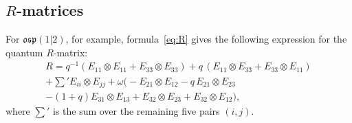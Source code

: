 \documentclass[12pt,a4paper]{article}
\newcommand{\osp}{\mathfrak{osp}}
\newcommand{\ot}{\otimes}
\begin{document}
\subsection{$R$-matrices}
For $\osp(1|2)$, for example, formula~\eqref{eq:R} gives the following expression for the quantum $R$-matrix:
\begin{multline*}
R=q^{-1}(E_{11}\ot E_{11}+E_{33}\ot E_{33})+q\,(E_{11}\ot E_{33}+E_{33}\ot E_{11})\\
+\sum\nolimits'E_{ii}\ot E_{jj}
+\omega\bigl(-E_{21}\ot E_{12}-q\,E_{21}\ot E_{23}\\
-(1+q)E_{31}\ot E_{13}+E_{32}\ot E_{23}+E_{32}\ot E_{12}\bigr),
\end{multline*}
where $\sum'$ is the sum over the remaining five pairs $(i,j)$.

\end{document}
